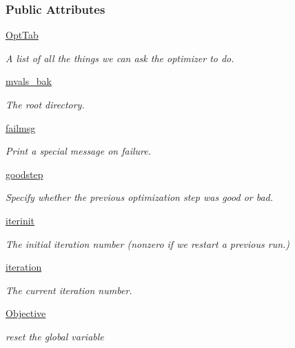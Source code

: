 \subsubsection*{Public Attributes}
\begin{DoxyCompactItemize}
\item 
\hyperlink{classsrc_1_1optimizer_1_1Optimizer_aecea79940c8171606998ef0acbc276b3}{Opt\+Tab}
\begin{DoxyCompactList}\small\item\em A list of all the things we can ask the optimizer to do. \end{DoxyCompactList}\item 
\hyperlink{classsrc_1_1optimizer_1_1Optimizer_aca8aba40ee48e50e42eaabfe5bf883cf}{mvals\+\_\+bak}
\begin{DoxyCompactList}\small\item\em The root directory. \end{DoxyCompactList}\item 
\hyperlink{classsrc_1_1optimizer_1_1Optimizer_a3d5d6e52049a6d6714ee94239a7a5df5}{failmsg}
\begin{DoxyCompactList}\small\item\em Print a special message on failure. \end{DoxyCompactList}\item 
\hyperlink{classsrc_1_1optimizer_1_1Optimizer_a034bcb3171a630aaab2e928886a67cbd}{goodstep}
\begin{DoxyCompactList}\small\item\em Specify whether the previous optimization step was good or bad. \end{DoxyCompactList}\item 
\hyperlink{classsrc_1_1optimizer_1_1Optimizer_ac7f1840fe54ce8f959a27f02ebccd406}{iterinit}
\begin{DoxyCompactList}\small\item\em The initial iteration number (nonzero if we restart a previous run.) \end{DoxyCompactList}\item 
\hyperlink{classsrc_1_1optimizer_1_1Optimizer_adddc631b1dc8efe874323c3d0c7b7b2f}{iteration}
\begin{DoxyCompactList}\small\item\em The current iteration number. \end{DoxyCompactList}\item 
\hyperlink{classsrc_1_1optimizer_1_1Optimizer_ab2a3d627b6f6cb2f76f22e97c9a2ef40}{Objective}
\begin{DoxyCompactList}\small\item\em reset the global variable \end{DoxyCompactList}\item 

\end{DoxyCompactItemize}
